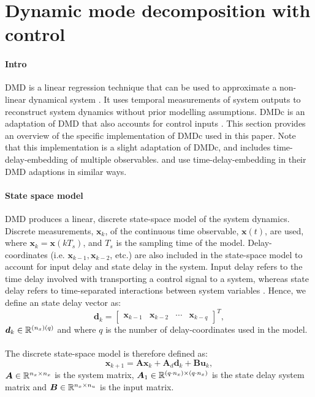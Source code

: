 \section{Dynamic mode decomposition with control}
\label{sec:dmdc}
    
    \paragraph{Intro}        
    DMD is a linear regression technique that can be used to approximate a non-linear dynamical system \cite{Tu2014}.
    It uses temporal measurements of system outputs to reconstruct system dynamics without prior modelling assumptions.
    DMDc is an adaptation of DMD that also accounts for control inputs \cite{Proctor2016c}.
    This section provides an overview of the specific implementation of DMDc used in this paper.        
    Note that this implementation is a slight adaptation of DMDc, and includes time-delay-embedding of multiple observables. 
    \cite{Korda2018b} and \cite{Arbabi2018} use time-delay-embedding in their DMD adaptions in similar ways.

    \paragraph{State space model}
    DMD produces a linear, discrete state-space model of the system dynamics.
    Discrete measurements, $\bm{x}_k$, of the continuous time observable, $\bm{x}(t)$, are used, 
    where $\bm{x}_k = \bm{x}(k T_s)$, and $T_s$ is the sampling time of the model.    
    Delay-coordinates (i.e. $\bm{x}_{k-1}, \bm{x}_{k-2}$, etc.) are also included in the state-space model to
    account for input delay and state delay in the system.
    Input delay refers to the time delay involved with transporting a control signal to a system, 
    whereas state delay refers to time-separated interactions between system variables \cite{Chen1999}.
    Hence, we define an state delay vector as:
    \begin{equation}
        \bm{d}_{k} = 
        \begin{bmatrix}
            \bm{x}_{k-1} & \bm{x}_{k-2} & \cdots & \bm{x}_{k-q}
        \end{bmatrix}^T ,
    \end{equation}
    $\bm{d}_k \in \mathbb{R}^{(n_x)(q)}$ and where $q$ is the number of delay-coordinates used in the model.
    
    \paragraph{}
    The discrete state-space model is therefore defined as:
    \begin{equation} \label{eq:dmd_state_space}
        \bm{x}_{k+1} = \bm{A} \bm{x}_k + \bm{A}_d \bm{d}_k + \bm{B} \bm{u}_k ,
    \end{equation}
    \( \bm{A} \in \mathbb{R}^{n_x \times n_x} \) is the system matrix, 
    \( \bm{A}_1 \in \mathbb{R}^{(q \cdot n_x) \times (q \cdot n_x)} \) is the state delay system matrix and 
    \( \bm{B} \in \mathbb{R}^{n_x \times n_u} \) is the input matrix.
    
